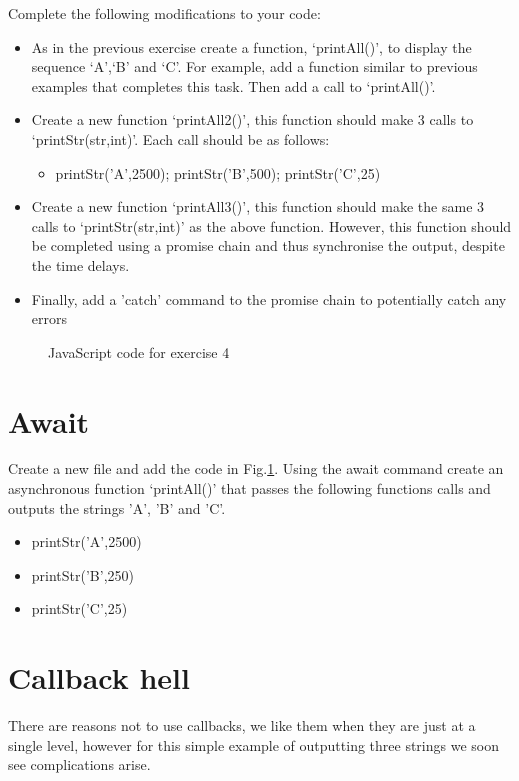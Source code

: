 Complete the following modifications to your code:
\begin{itemize}
	\item  As in the previous exercise create a function, `printAll()', to display the sequence `A',`B' and `C'. For example, add a function similar to previous examples that completes this task. Then add a call to `printAll()'.
	\item Create a new function `printAll2()', this function should make 3 calls to `printStr(str,int)'. Each call should be as follows: 
		\begin{itemize}
			\item printStr('A',2500); printStr('B',500); printStr('C',25)
		\end{itemize}
	\item Create a new function `printAll3()', this function should make the same 3 calls to `printStr(str,int)' as the above function. However, this function should be completed using a promise chain and thus synchronise the output, despite the time delays.
	\item Finally, add a 'catch' command to the promise chain to potentially catch any errors
\end{itemize}


\begin{figure}[t!]
	\centering

	\caption{JavaScript code for exercise 4}
	\label{fi:ex54}
\end{figure}

\newpage
\section{Await}
Create a new file and add the code in Fig.\ref{fi:ex54}. Using the await command create an asynchronous function `printAll()' that passes the following functions calls and outputs the strings 'A', 'B' and 'C'.
\begin{itemize}
	\item printStr('A',2500)
	\item printStr('B',250)
	\item printStr('C',25)
\end{itemize}
\newpage
\section{Callback hell}
There are reasons not to use callbacks, we like them when they are just at a single level, however for this simple example of outputting three strings we soon see complications arise.

